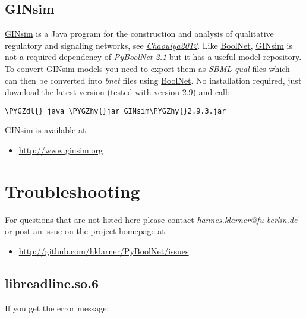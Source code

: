 \documentclass[letterpaper,10pt,english]{sphinxmanual}
\def\PYGZdl{\char`\$}
\def\PYGZhy{\char`\-}
\begin{document}
\subsection{GINsim}
\label{Installation:installation-ginsim}\label{Installation:ginsim}
\href{http://ginsim.org/home}{GINsim} is a Java program for the construction and analysis of qualitative regulatory and signaling networks, see {\hyperref[Bibliography:chaouiya2012]{\emph{Chaouiya2012}}}.
Like \href{https://cran.r-project.org/web/packages/BoolNet/index.html}{BoolNet}, \href{http://ginsim.org/home}{GINsim} is not a required dependency of \emph{PyBoolNet 2.1} but it has a useful model repository. To convert \href{http://ginsim.org/home}{GINsim} models you need to export them as \emph{SBML-qual} files which can then be converted into \emph{bnet} files using \href{https://cran.r-project.org/web/packages/BoolNet/index.html}{BoolNet}.
No installation required, just download the latest version (tested with version 2.9) and call:

\begin{Verbatim}[commandchars=\\\{\}]
\PYGZdl{} java \PYGZhy{}jar GINsim\PYGZhy{}2.9.3.jar
\end{Verbatim}

\href{http://ginsim.org/home}{GINsim} is available at
\begin{itemize}
\item {} 
\href{http://www.ginsim.org}{http://www.ginsim.org}

\end{itemize}


\section{Troubleshooting}
\label{Installation:installation-troubleshooting}\label{Installation:troubleshooting}
For questions that are not listed here please contact \emph{hannes.klarner@fu-berlin.de} or post an issue on the project homepage at
\begin{itemize}
\item {} 
\href{http://github.com/hklarner/PyBoolNet/issues}{http://github.com/hklarner/PyBoolNet/issues}

\end{itemize}


\subsection{libreadline.so.6}
\label{Installation:libreadline-so-6}
If you get the error message:
\end{document}
